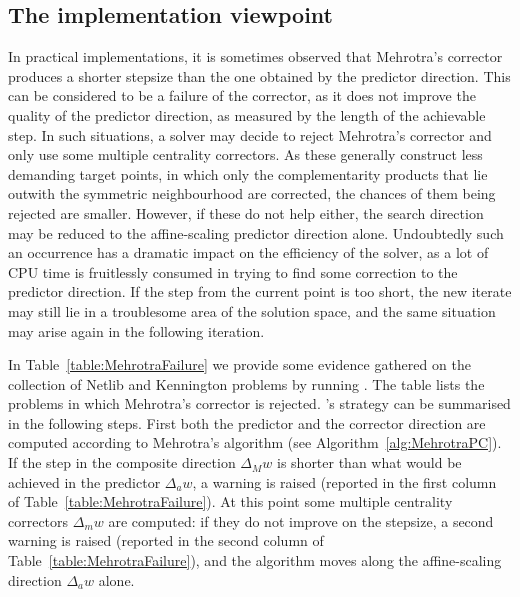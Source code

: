 %
%
\subsection{The implementation viewpoint}

In practical implementations, it is sometimes observed
that Mehrotra's corrector produces a shorter stepsize 
than the one obtained by the predictor direction. 
This can be considered to be a failure of the corrector, as it
does not improve the quality of the predictor direction,
as measured by the length of the achievable step.
In such situations, a solver may decide to reject Mehrotra's corrector 
and only use some multiple centrality correctors. 
As these generally construct less demanding target points,
in which only the complementarity products that lie outwith
the symmetric neighbourhood are corrected,
the chances of them being rejected are smaller. 
However, if these do not help either, the search direction may be reduced
to the affine-scaling predictor direction alone.
Undoubtedly such an occurrence has a dramatic impact on the 
efficiency of the solver, as a lot of CPU time is fruitlessly consumed
in trying to find some correction to the predictor
direction.
If the step from the current point is too short, the new iterate may
still lie in a troublesome area of the solution space, and the
same situation may arise again in the following iteration.

In Table~\ref{table:MehrotraFailure} we provide some evidence
gathered on the collection of Netlib and Kennington problems
by running  \cite{HOPDM}.
The table lists the problems in which Mehrotra's corrector is rejected.
\HOPDM's strategy can be summarised in the following steps.
First both the predictor and the corrector direction are
computed according to Mehrotra's algorithm 
(see Algorithm~\ref{alg:MehrotraPC}). If the step in the 
composite direction $\Delta_M w$ is shorter than what would be
achieved in the predictor $\Delta_a w$, a warning is raised
(reported in the first column of Table~\ref{table:MehrotraFailure}).
At this point some multiple centrality correctors $\Delta_m w$ are computed:
if they do not improve on the stepsize, a second warning is raised
(reported in the second column of Table~\ref{table:MehrotraFailure}),
and the algorithm moves along the affine-scaling direction $\Delta_a w$
alone.

